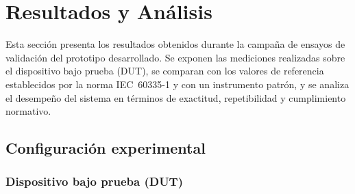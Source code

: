 %
%
%

\newcommand{\PLACEHOLDER}[1]{\textcolor{red}{\textbf{[#1]}}}

\section{Resultados y Análisis}
\label{sec:resultados}

Esta sección presenta los resultados obtenidos durante la campaña
de ensayos de validación del prototipo desarrollado.
Se exponen las mediciones realizadas sobre el dispositivo bajo
prueba (DUT), se comparan con los valores de referencia
establecidos por la norma IEC~60335-1 y con un instrumento patrón,
y se analiza el desempeño del sistema en términos de exactitud,
repetibilidad y cumplimiento normativo.

\subsection{Configuración experimental}
\label{subsec:config_experimental}

\subsubsection{Dispositivo bajo prueba (DUT)}

